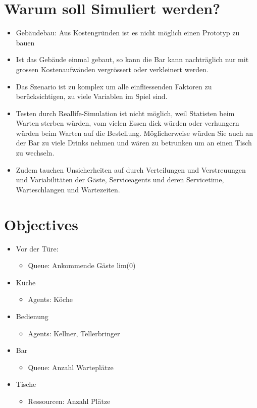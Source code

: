 \documentclass[ngerman,a4paper,12pt]{scrreprt}
\begin{document}
\section{Warum soll Simuliert werden?}
\begin{itemize}
	\item Gebäudebau: Aus Kostengründen ist es nicht möglich einen Prototyp zu bauen
	\item Ist das Gebäude einmal gebaut, so kann die Bar kann nachträglich nur mit grossen Kostenaufwänden vergrössert oder verkleinert werden.
	\item Das Szenario ist zu komplex um alle einfliessenden Faktoren zu berücksichtigen, zu viele Variablen im Spiel sind.
	\item Testen durch Reallife-Simulation ist nicht möglich, weil Statisten beim Warten sterben würden, vom vielen Essen dick würden oder verhungern würden beim Warten auf die Bestellung. Möglicherweise würden Sie auch an der Bar zu viele Drinks nehmen und wären zu betrunken um an einen Tisch zu wechseln.
	\item Zudem tauchen Unsicherheiten auf durch Verteilungen und Verstreuungen und Variabilitäten der Gäste, Serviceagents und deren Servicetime, Warteschlangen und Wartezeiten.
\end{itemize}

\section{Objectives}
\begin{itemize}
	\item Vor der Türe:
		\begin{itemize}
			\item Queue: Ankommende Gäste lim(0)
		\end{itemize}
	\item Küche
		\begin{itemize}
			\item Agents: Köche
		\end{itemize}
	\item Bedienung
		\begin{itemize}
			\item Agents: Kellner, Tellerbringer
		\end{itemize}
	\item Bar
		\begin{itemize}
			\item Queue: Anzahl Warteplätze
		\end{itemize}
	\item Tische
		\begin{itemize}
			\item Ressourcen: Anzahl Plätze
		\end{itemize}
\end{itemize}
\end{document}
